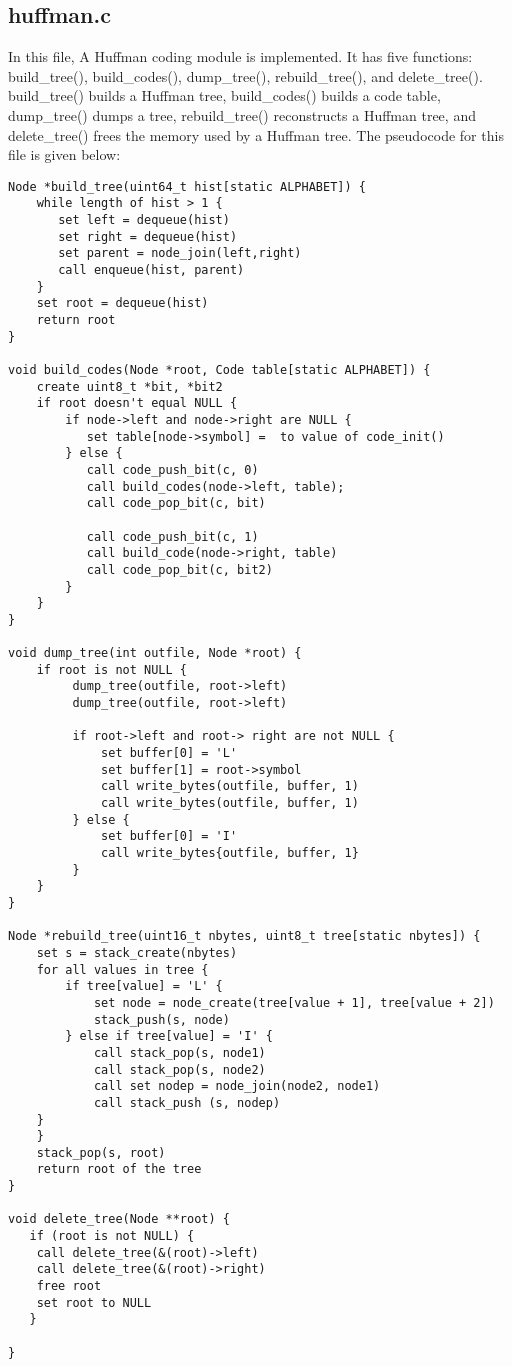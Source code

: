 \documentclass[11pt]{article}
\begin{document}
\subsection{huffman.c}
In this file, A Huffman coding module is implemented. It has five functions: build\_tree(), build\_codes(), dump\_tree(), rebuild\_tree(), and delete\_tree(). build\_tree() builds a Huffman tree, build\_codes() builds a code table, dump\_tree() dumps a tree, rebuild\_tree() reconstructs a Huffman tree, and delete\_tree() frees the memory used by a Huffman tree. The pseudocode for this file is given below:
\begin{verbatim}
Node *build_tree(uint64_t hist[static ALPHABET]) {
    while length of hist > 1 {
       set left = dequeue(hist)
       set right = dequeue(hist)
       set parent = node_join(left,right)
       call enqueue(hist, parent)
    }
    set root = dequeue(hist)
    return root
}

void build_codes(Node *root, Code table[static ALPHABET]) {
    create uint8_t *bit, *bit2
    if root doesn't equal NULL {
        if node->left and node->right are NULL {
           set table[node->symbol] =  to value of code_init()
        } else {
           call code_push_bit(c, 0)
           call build_codes(node->left, table);
           call code_pop_bit(c, bit)
           
           call code_push_bit(c, 1)
           call build_code(node->right, table)
           call code_pop_bit(c, bit2)
        } 
    }
}

void dump_tree(int outfile, Node *root) {
    if root is not NULL {
         dump_tree(outfile, root->left)
         dump_tree(outfile, root->left)
         
         if root->left and root-> right are not NULL {
             set buffer[0] = 'L'
             set buffer[1] = root->symbol
             call write_bytes(outfile, buffer, 1)
             call write_bytes(outfile, buffer, 1)
         } else {
             set buffer[0] = 'I'
             call write_bytes{outfile, buffer, 1}
         }
    }
}

Node *rebuild_tree(uint16_t nbytes, uint8_t tree[static nbytes]) {
    set s = stack_create(nbytes)
    for all values in tree {
        if tree[value] = 'L' {
            set node = node_create(tree[value + 1], tree[value + 2])
            stack_push(s, node)
        } else if tree[value] = 'I' {
            call stack_pop(s, node1)
            call stack_pop(s, node2)
            call set nodep = node_join(node2, node1)
            call stack_push (s, nodep)
    }
    }
    stack_pop(s, root) 
    return root of the tree
}

void delete_tree(Node **root) {
   if (root is not NULL) {
    call delete_tree(&(root)->left)
    call delete_tree(&(root)->right)
    free root
    set root to NULL
   }

}
\end{verbatim}
\end{document}
